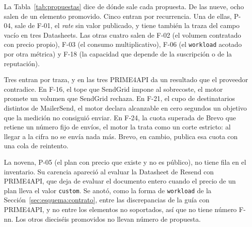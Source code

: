 \begin{table}[tbp]
\caption[Inventario de elementos no soportados sobre las ocho APIs del catálogo]{Inventario de elementos no soportados sobre las ocho APIs del catálogo. APIs: en cuántas de las ocho aparece el elemento entero, sumando la variante que cumple el enunciado con otro mecanismo. Vía, recurr.: dos APIs o más. traza: una sola API con las tres condiciones cumplidas (Sección~\ref{sec:esquema:metodo}). En los once no promovidos, la columna Vía indica la condición de la traza que no se cumple: L2, la consecuencia ejecutada sobre PRIME4API con caso de control, o L3, que ningún mecanismo de la guía cubra la carencia ni la explique un defecto conocido del motor. Prop., discus.: promovido que se discute sin formular extensión. Los números que faltan corresponden a elementos retirados o absorbidos por otros. La matriz completa, con la marca de cada API y su fuente, está en \texttt{03\_datos/\allowbreak RECURRENCIA\_2026-09-23.md} del repositorio del trabajo.}
\label{tab:recurrencia}
\end{table}

La Tabla~\ref{tab:propuestas} dice de dónde sale cada propuesta.
De las nueve, ocho salen de un elemento promovido.
Cinco entran por recurrencia.
Una de ellas, P-04, sale de F-01, el \textit{rate} sin valor publicado, y tiene también la traza del campo vacío en tres Datasheets.
Las otras cuatro salen de F-02 (el volumen contratado con precio propio), F-03 (el consumo multiplicativo), F-06 (el \texttt{workload} acotado por otra métrica) y F-18 (la capacidad que depende de la suscripción o de la reputación).

Tres entran por traza, y en las tres PRIME4API da un resultado que el proveedor contradice.
En F-16, el tope que SendGrid impone al sobrecoste, el motor promete un volumen que SendGrid rechaza.
En F-21, el cupo de destinatarios distintos de MailerSend, el motor declara alcanzable en cero segundos un objetivo que la medición no consiguió enviar.
En F-24, la cuota superada de Brevo que retiene un número fijo de envíos, el motor la trata como un corte estricto: al llegar a la cifra no se envía nada más.
Brevo, en cambio, publica esa cuota con una cola de reintento.

La novena, P-05 (el plan con precio que existe y no es público), no tiene fila en el inventario.
Su carencia apareció al evaluar la Datasheet de Resend con PRIME4API, que deja de evaluar el documento entero cuando el precio de un plan lleva el valor \texttt{custom}.
Se anotó, como la forma de \texttt{workload} de la Sección~\ref{sec:esquema:contrato}, entre las discrepancias de la guía con PRIME4API, y no entre los elementos no soportados, así que no tiene número F-nn.
Los otros dieciséis promovidos no llevan número de propuesta.

